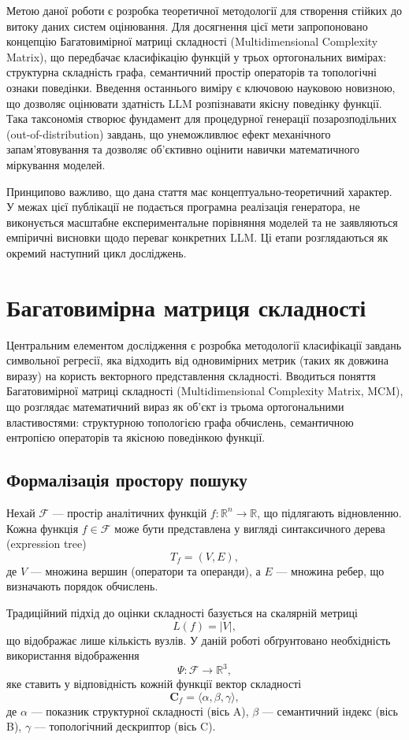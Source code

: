 \documentclass[11pt]{article}
\begin{document}
Метою даної роботи є розробка теоретичної методології для створення стійких до витоку даних систем оцінювання. Для досягнення цієї мети запропоновано концепцію Багатовимірної матриці складності (Multidimensional Complexity Matrix), що передбачає класифікацію функцій у трьох ортогональних вимірах: структурна складність графа, семантичний простір операторів та топологічні ознаки поведінки. Введення останнього виміру є ключовою науковою новизною, що дозволяє оцінювати здатність LLM розпізнавати якісну поведінку функції. Така таксономія створює фундамент для процедурної генерації позарозподільних (out-of-distribution) завдань, що унеможливлює ефект механічного запам'ятовування та дозволяє об'єктивно оцінити навички математичного міркування моделей.

Принципово важливо, що дана стаття має концептуально-теоретичний характер. У межах цієї публікації не подається програмна реалізація генератора, не виконується масштабне експериментальне порівняння моделей та не заявляються емпіричні висновки щодо переваг конкретних LLM. Ці етапи розглядаються як окремий наступний цикл досліджень.

\section{Багатовимірна матриця складності}

Центральним елементом дослідження є розробка методології класифікації завдань символьної регресії, яка відходить від одновимірних метрик (таких як довжина виразу) на користь векторного представлення складності. Вводиться поняття Багатовимірної матриці складності (Multidimensional Complexity Matrix, MCM), що розглядає математичний вираз як об'єкт із трьома ортогональними властивостями: структурною топологією графа обчислень, семантичною ентропією операторів та якісною поведінкою функції.

\subsection{Формалізація простору пошуку}

Нехай $\mathcal{F}$ --- простір аналітичних функцій $f:\mathbb{R}^n\to\mathbb{R}$, що підлягають відновленню. Кожна функція $f\in\mathcal{F}$ може бути представлена у вигляді синтаксичного дерева (expression tree)
\[
T_f=(V,E),
\]
де $V$ --- множина вершин (оператори та операнди), а $E$ --- множина ребер, що визначають порядок обчислень.

Традиційний підхід до оцінки складності базується на скалярній метриці
\[
L(f)=|V|,
\]
що відображає лише кількість вузлів. У даній роботі обґрунтовано необхідність використання відображення
\[
\Psi:\mathcal{F}\to\mathbb{R}^3,
\]
яке ставить у відповідність кожній функції вектор складності
\[
\mathbf{C}_f=\langle \alpha,\beta,\gamma\rangle,
\]
де $\alpha$ --- показник структурної складності (вісь A), $\beta$ --- семантичний індекс (вісь B), $\gamma$ --- топологічний дескриптор (вісь C).
\end{document}
